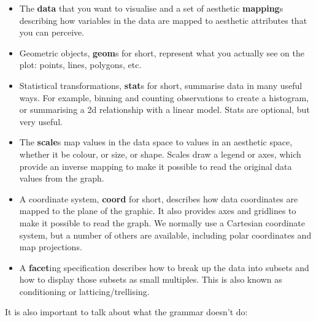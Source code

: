 \begin{itemize}
  \item The \textbf{data} that you want to visualise and a set of aesthetic \textbf{mapping}s describing how variables in the data are mapped to aesthetic attributes that you can perceive.

  \item Geometric objects, \textbf{geom}s for short, represent what you actually see on the plot: points, lines, polygons, etc.

  \item Statistical transformations, \textbf{stat}s for short, summarise data in many useful ways.  For example, binning and counting observations to create a histogram, or summarising a 2d relationship with a linear model.  Stats are optional, but very useful.

  \item The \textbf{scale}s map values in the data space to values in an aesthetic space, whether it be colour, or size, or shape.  Scales draw a legend or axes, which provide an inverse mapping to make it possible to read the original data values from the graph.

  \item A coordinate system, \textbf{coord} for short, describes how data coordinates are mapped to the plane of the graphic.  It also provides axes and gridlines to make it possible to read the graph.  We normally use a Cartesian coordinate system, but a number of others are available, including polar coordinates and map projections.

  \item A \textbf{facet}ing specification describes how to break up the data into subsets and how to display those subsets as small multiples.  This is also known as conditioning or latticing/trellising.

\end{itemize}

\noindent It is also important to talk about what the grammar doesn't do:

